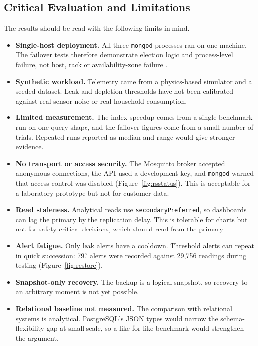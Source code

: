 \documentclass[11pt,a4paper]{article}
\begin{document}
\subsection{Critical Evaluation and Limitations}\label{sec:limits}
The results should be read with the following limits in mind.
\begin{itemize}[noitemsep]
\item \textbf{Single-host deployment.} All three \texttt{mongod} processes ran on one machine. The failover tests therefore demonstrate election logic and process-level failure, not host, rack or availability-zone failure \citep{mongoRepl}.
\item \textbf{Synthetic workload.} Telemetry came from a physics-based simulator and a seeded dataset. Leak and depletion thresholds have not been calibrated against real sensor noise or real household consumption.
\item \textbf{Limited measurement.} The index speedup comes from a single benchmark run on one query shape, and the failover figures come from a small number of trials. Repeated runs reported as median and range would give stronger evidence.
\item \textbf{No transport or access security.} The Mosquitto broker accepted anonymous connections, the API used a development key, and \texttt{mongod} warned that access control was disabled (Figure~\ref{fig:rsstatus}). This is acceptable for a laboratory prototype but not for customer data.
\item \textbf{Read staleness.} Analytical reads use \texttt{secondaryPreferred}, so dashboards can lag the primary by the replication delay. This is tolerable for charts but not for safety-critical decisions, which should read from the primary.
\item \textbf{Alert fatigue.} Only leak alerts have a cooldown. Threshold alerts can repeat in quick succession: 797 alerts were recorded against 29,756 readings during testing (Figure~\ref{fig:restore}).
\item \textbf{Snapshot-only recovery.} The backup is a logical snapshot, so recovery to an arbitrary moment is not yet possible.
\item \textbf{Relational baseline not measured.} The comparison with relational systems is analytical. PostgreSQL's JSON types \citep{pgJSON} would narrow the schema-flexibility gap at small scale, so a like-for-like benchmark would strengthen the argument.
\end{itemize}
\end{document}
